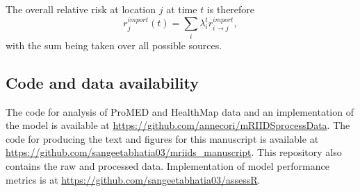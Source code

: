 \documentclass[9pt,twocolumn,twoside,lineno]{pnas-new}
\begin{document}
{The overall relative risk at location \(j\) at time \(t\) is therefore
\[
  r_{j}^{import}(t) = \sum_{i} \lambda_i^t r_{i \rightarrow j}^{import},
\]  
with the sum being taken over all possible sources.

\subsection*{Code and data availability}

The code for analysis of ProMED and HealthMap data and an
implementation of the model is available at
\url{https://github.com/annecori/mRIIDSprocessData}. The code for
producing the text and figures for this manuscript is available at
\url{https://github.com/sangeetabhatia03/mriids_manuscript}. This
repository also contains the raw and processed data. Implementation
of model performance metrics is at
\url{https://github.com/sangeetabhatia03/assessR}.
}

\showmatmethods{} %


\showacknow{} %


\end{document}
